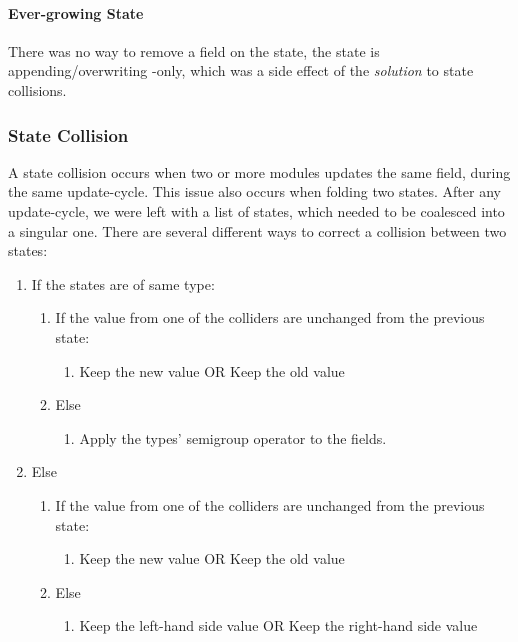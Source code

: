 \paragraph{Ever-growing State} There was no way to remove a field on the state,
the state is appending/overwriting -only, which was a side effect of the
\textit{solution} to state collisions.

\subsubsection{State Collision} \label{sec:collision}

A state collision occurs when two or more modules updates the same field, during
the same update-cycle. This issue also occurs when folding two states. After any
update-cycle, we were left with a list of states, which needed to be coalesced
into a singular one. There are several different ways to correct a collision
between two states:

\begin{enumerate}
  \item If the states are of same type:
    \begin{enumerate}
      \item If the value from one of the colliders are unchanged from the previous state:
        \begin{enumerate}
          \item Keep the new value OR Keep the old value
        \end{enumerate}
      \item Else
        \begin{enumerate}
          \item Apply the types' semigroup operator to the fields.
        \end{enumerate}
    \end{enumerate}
  \item Else
    \begin{enumerate}
      \item If the value from one of the colliders are unchanged from the previous state:
        \begin{enumerate}
          \item Keep the new value OR Keep the old value
        \end{enumerate}
      \item Else
        \begin{enumerate}
          \item Keep the left-hand side value OR Keep the right-hand side value
        \end{enumerate}
    \end{enumerate}
\end{enumerate}

